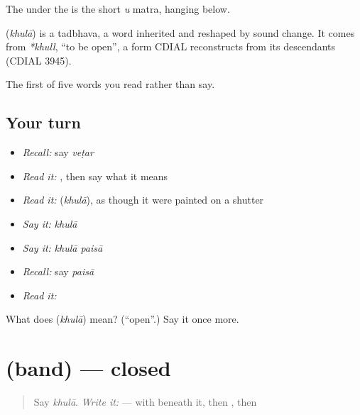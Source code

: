 The  under the  is the short \emph{u} matra, hanging below.

\begin{cousinweb}
\textbf{} (\emph{khulā}) is a tadbhava, a word inherited and reshaped by sound change. It comes from \emph{*khull}, \textquotedblleft{}to be open\textquotedblright{}, a form CDIAL reconstructs from its descendants (CDIAL 3945).
\end{cousinweb}

\begin{grammarlens}[title={What you've built}]
The first of five words you read rather than say.
\end{grammarlens}

\subsection*{Your turn}
\begin{itemize}
\raggedright
  \item \emph{Recall:} say \emph{veṭar}
  \item \emph{Read it:} \textbf{}, then say what it means
  \item \emph{Read it:} \textbf{} (\emph{khulā}), as though it were painted on a shutter
  \item \emph{Say it:} \emph{khulā}
  \item \emph{Say it:} \emph{khulā paisā}
  \item \emph{Recall:} say \emph{paisā}
  \item \emph{Read it:} \textbf{}
\end{itemize}

\begin{tcolorbox}[breakable,colback=teal!4,colframe=teal!35!black,title={Before you move on}]
What does \textbf{} (\emph{khulā}) mean? (\textquotedblleft{}open\textquotedblright{}.) Say it once more.
\end{tcolorbox}
\section[\texorpdfstring{\hi{बंद} (band)}{बंद (band)}]{ (band) — closed}

\label{lesson:HI-C74-closed}



\begin{quote}
Say \emph{khulā}. \emph{Write it:} \textbf{} —  with  beneath it, then , then 
\end{quote}

